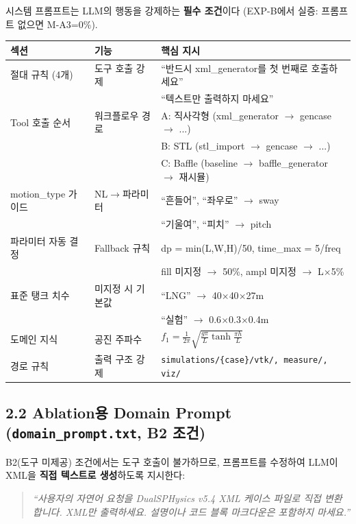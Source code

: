 \documentclass[10pt,a4paper]{article}
\begin{document}
시스템 프롬프트는 LLM의 행동을 강제하는 \textbf{필수 조건}이다 (EXP-B에서 실증: 프롬프트 없으면 M-A3=0\%).

\begin{center}
\small
\begin{tabular}{p{3.5cm}p{3cm}p{6.5cm}}
\toprule
\textbf{섹션} & \textbf{기능} & \textbf{핵심 지시} \\
\midrule
절대 규칙 (4개) & 도구 호출 강제 & ``반드시 xml\_generator를 첫 번째로 호출하세요'' \\
 & & ``텍스트만 출력하지 마세요'' \\
\midrule
Tool 호출 순서 & 워크플로우 경로 & A: 직사각형 (xml\_generator $\rightarrow$ gencase $\rightarrow$ ...) \\
 & & B: STL (stl\_import $\rightarrow$ gencase $\rightarrow$ ...) \\
 & & C: Baffle (baseline $\rightarrow$ baffle\_generator $\rightarrow$ 재시뮬) \\
\midrule
motion\_type 가이드 & NL$\rightarrow$파라미터 & ``흔들어'', ``좌우로'' $\rightarrow$ sway \\
 & & ``기울여'', ``피치'' $\rightarrow$ pitch \\
\midrule
파라미터 자동 결정 & Fallback 규칙 & dp = min(L,W,H)/50, time\_max = 5/freq \\
 & & fill 미지정 $\rightarrow$ 50\%, ampl 미지정 $\rightarrow$ L$\times$5\% \\
\midrule
표준 탱크 치수 & 미지정 시 기본값 & ``LNG'' $\rightarrow$ 40$\times$40$\times$27m \\
 & & ``실험'' $\rightarrow$ 0.6$\times$0.3$\times$0.4m \\
\midrule
도메인 지식 & 공진 주파수 & $f_1 = \frac{1}{2\pi}\sqrt{\frac{g\pi}{L}\tanh\frac{\pi h}{L}}$ \\
\midrule
경로 규칙 & 출력 구조 강제 & \texttt{simulations/\{case\}/vtk/, measure/, viz/} \\
\bottomrule
\end{tabular}
\end{center}

\subsection{2.2 Ablation용 Domain Prompt (\texttt{domain\_prompt.txt}, B2 조건)}

B2(도구 미제공) 조건에서는 도구 호출이 불가하므로, 프롬프트를 수정하여 LLM이 XML을 \textbf{직접 텍스트로 생성}하도록 지시한다:

\begin{quote}
\small\itshape
``사용자의 자연어 요청을 DualSPHysics v5.4 XML 케이스 파일로 직접 변환합니다. XML만 출력하세요. 설명이나 코드 블록 마크다운은 포함하지 마세요.''
\end{quote}
\end{document}
